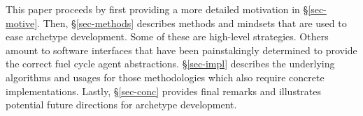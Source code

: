 This paper proceeds by first providing a more detailed motivation 
in \S \ref{sec-motive}. Then, \S \ref{sec-methods} describes 
methods and mindsets that are used to ease archetype development.
Some of these are high-level strategies. Others amount to 
software interfaces that have been painstakingly determined to 
provide the correct fuel cycle agent abstractions. 
\S \ref{sec-impl} describes the underlying algorithms and usages
for those methodologies which also require concrete implementations.
Lastly, \S \ref{sec-conc} provides final remarks and illustrates
potential future directions for \cyclus archetype development.
